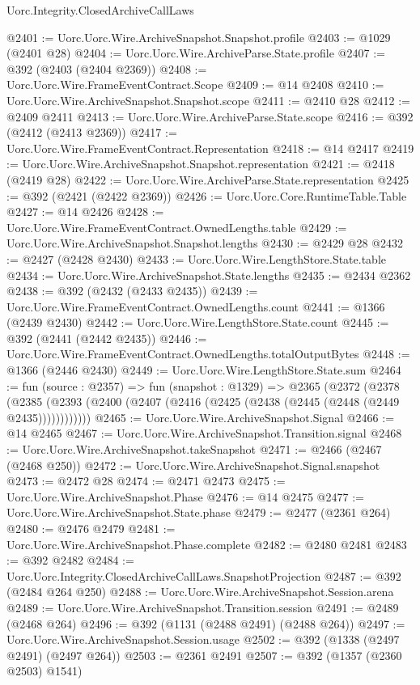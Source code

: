 \begin{lexlean}{Uorc.Integrity.ClosedArchiveCallLaws}
\begin{coremodule}
@2401 := Uorc.Uorc.Wire.ArchiveSnapshot.Snapshot.profile
@2403 := @1029 (@2401 @28)
@2404 := Uorc.Uorc.Wire.ArchiveParse.State.profile
@2407 := @392 (@2403 (@2404 @2369))
@2408 := Uorc.Uorc.Wire.FrameEventContract.Scope
@2409 := @14 @2408
@2410 := Uorc.Uorc.Wire.ArchiveSnapshot.Snapshot.scope
@2411 := @2410 @28
@2412 := @2409 @2411
@2413 := Uorc.Uorc.Wire.ArchiveParse.State.scope
@2416 := @392 (@2412 (@2413 @2369))
@2417 := Uorc.Uorc.Wire.FrameEventContract.Representation
@2418 := @14 @2417
@2419 := Uorc.Uorc.Wire.ArchiveSnapshot.Snapshot.representation
@2421 := @2418 (@2419 @28)
@2422 := Uorc.Uorc.Wire.ArchiveParse.State.representation
@2425 := @392 (@2421 (@2422 @2369))
@2426 := Uorc.Uorc.Core.RuntimeTable.Table
@2427 := @14 @2426
@2428 := Uorc.Uorc.Wire.FrameEventContract.OwnedLengths.table
@2429 := Uorc.Uorc.Wire.ArchiveSnapshot.Snapshot.lengths
@2430 := @2429 @28
@2432 := @2427 (@2428 @2430)
@2433 := Uorc.Uorc.Wire.LengthStore.State.table
@2434 := Uorc.Uorc.Wire.ArchiveSnapshot.State.lengths
@2435 := @2434 @2362
@2438 := @392 (@2432 (@2433 @2435))
@2439 := Uorc.Uorc.Wire.FrameEventContract.OwnedLengths.count
@2441 := @1366 (@2439 @2430)
@2442 := Uorc.Uorc.Wire.LengthStore.State.count
@2445 := @392 (@2441 (@2442 @2435))
@2446 := Uorc.Uorc.Wire.FrameEventContract.OwnedLengths.totalOutputBytes
@2448 := @1366 (@2446 @2430)
@2449 := Uorc.Uorc.Wire.LengthStore.State.sum
@2464 := fun (source : @2357) =>
  fun (snapshot : @1329) =>
  @2365
    (@2372
      (@2378 (@2385 (@2393 (@2400 (@2407 (@2416 (@2425 (@2438 (@2445 (@2448 (@2449 @2435))))))))))))
@2465 := Uorc.Uorc.Wire.ArchiveSnapshot.Signal
@2466 := @14 @2465
@2467 := Uorc.Uorc.Wire.ArchiveSnapshot.Transition.signal
@2468 := Uorc.Uorc.Wire.ArchiveSnapshot.takeSnapshot
@2471 := @2466 (@2467 (@2468 @250))
@2472 := Uorc.Uorc.Wire.ArchiveSnapshot.Signal.snapshot
@2473 := @2472 @28
@2474 := @2471 @2473
@2475 := Uorc.Uorc.Wire.ArchiveSnapshot.Phase
@2476 := @14 @2475
@2477 := Uorc.Uorc.Wire.ArchiveSnapshot.State.phase
@2479 := @2477 (@2361 @264)
@2480 := @2476 @2479
@2481 := Uorc.Uorc.Wire.ArchiveSnapshot.Phase.complete
@2482 := @2480 @2481
@2483 := @392 @2482
@2484 := Uorc.Uorc.Integrity.ClosedArchiveCallLaws.SnapshotProjection
@2487 := @392 (@2484 @264 @250)
@2488 := Uorc.Uorc.Wire.ArchiveSnapshot.Session.arena
@2489 := Uorc.Uorc.Wire.ArchiveSnapshot.Transition.session
@2491 := @2489 (@2468 @264)
@2496 := @392 (@1131 (@2488 @2491) (@2488 @264))
@2497 := Uorc.Uorc.Wire.ArchiveSnapshot.Session.usage
@2502 := @392 (@1338 (@2497 @2491) (@2497 @264))
@2503 := @2361 @2491
@2507 := @392 (@1357 (@2360 @2503) @1541)

\end{coremodule}
\end{lexlean}
